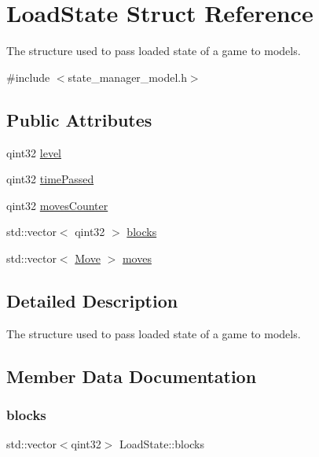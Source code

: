 \hypertarget{struct_load_state}{}\section{Load\+State Struct Reference}
\label{struct_load_state}


The structure used to pass loaded state of a game to models.  




{\ttfamily \#include $<$state\+\_\+manager\+\_\+model.\+h$>$}

\subsection*{Public Attributes}
\begin{DoxyCompactItemize}
\item 
qint32 \mbox{\hyperlink{struct_load_state_ab48ca57dd161df569b22a88f457df244}{level}}
\item 
qint32 \mbox{\hyperlink{struct_load_state_a1c37e682001c48d107c981f9e225e83c}{time\+Passed}}
\item 
qint32 \mbox{\hyperlink{struct_load_state_a72929d48135962cbff700c440a57553f}{moves\+Counter}}
\item 
std\+::vector$<$ qint32 $>$ \mbox{\hyperlink{struct_load_state_a1496d8006e1f1ec80803818ed11038eb}{blocks}}
\item 
std\+::vector$<$ \mbox{\hyperlink{struct_move}{Move}} $>$ \mbox{\hyperlink{struct_load_state_a00e978ec8c48f99e7007814da01f328b}{moves}}
\end{DoxyCompactItemize}


\subsection{Detailed Description}
The structure used to pass loaded state of a game to models. 



\subsection{Member Data Documentation}
\mbox{\label{struct_load_state_a1496d8006e1f1ec80803818ed11038eb}} 
\subsubsection{\texorpdfstring{blocks}{blocks}}
{\footnotesize\ttfamily std\+::vector$<$qint32$>$ Load\+State\+::blocks}

